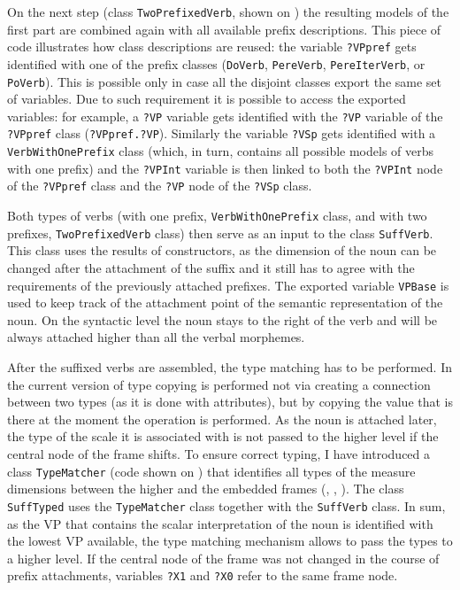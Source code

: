 On the next step (class \texttt{TwoPrefixedVerb}, shown on ) the resulting models of the first part are combined again with all available prefix descriptions. This piece of code illustrates how class descriptions are reused: the variable \texttt{?VPpref} gets identified with one of the prefix classes (\texttt{DoVerb}, \texttt{PereVerb}, \texttt{PereIterVerb}, or \texttt{PoVerb}). This is possible only in case all the disjoint classes export the same set of variables. Due to such requirement it is possible to access the exported variables: for example, a \texttt{?VP} variable gets identified with the \texttt{?VP} variable of the \texttt{?VPpref} class (\texttt{?VPpref.?VP}). Similarly the variable \texttt{?VSp} gets identified with a \texttt{VerbWithOnePrefix} class (which, in turn, contains all possible models of verbs with one prefix) and the \texttt{?VPInt} variable is then linked to both the \texttt{?VPInt} node of the \texttt{?VPpref} class and the \texttt{?VP} node of the \texttt{?VSp} class. 

Both types of verbs (with one prefix, \texttt{VerbWithOnePrefix} class, and with two prefixes, \texttt{TwoPrefixedVerb} class) then serve as an input to the class \texttt{SuffVerb}. This class uses the results of  constructors, as the dimension of the noun can be changed after the attachment of the suffix and it still has to agree with the requirements of the previously attached prefixes. The exported variable \texttt{VPBase} is used to keep track of the attachment point of the semantic representation of the noun. On the syntactic level the noun stays to the right of the verb and will be always attached higher than all the verbal morphemes. 

After the suffixed verbs are assembled, the type matching has to be performed. In the current version of  type copying is performed not via creating a connection between two types (as it is done with attributes), but by copying the value that is there at the moment the operation is performed. As the noun is attached later, the type of the scale it is associated with is not passed to the higher level if the central node of the frame shifts. To ensure correct typing, I have introduced a class \texttt{TypeMatcher} (code shown on ) that identifies all types of the measure dimensions between the higher and the embedded frames (\MDIM, \NOUNDIM, \VERBDIM). The class \texttt{SuffTyped} uses the \texttt{TypeMatcher} class together with the \texttt{SuffVerb} class. In sum, as the VP that contains the scalar interpretation of the noun is identified with the lowest VP available, the type matching mechanism allows to pass the types to a higher level. If the central node of the frame was not changed in the course of prefix attachments, variables \texttt{?X1} and \texttt{?X0} refer to the same frame node.\largerpage

